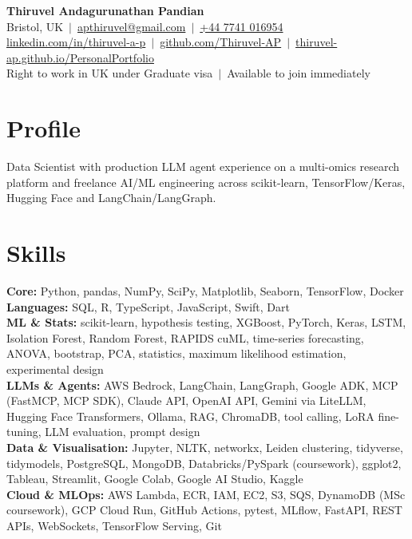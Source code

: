 \documentclass[a4paper,11pt]{article}
\begin{document}
\fontsize{11}{13.2}\selectfont

\begin{center}
  {\LARGE\bfseries Thiruvel Andagurunathan Pandian}\\[3pt]
  Bristol, UK \,$|$\, \href{mailto:apthiruvel@gmail.com}{apthiruvel@gmail.com} \,$|$\, \href{tel:+447741016954}{+44 7741 016954}\\[1pt]
\href{https://www.linkedin.com/in/thiruvel-a-p/}{linkedin.com/in/thiruvel-a-p} \,$|$\, \href{https://github.com/Thiruvel-AP}{github.com/Thiruvel-AP} \,$|$\, \href{https://thiruvel-ap.github.io/PersonalPortfolio/}{thiruvel-ap.github.io/PersonalPortfolio}\\[1pt]
  Right to work in UK under Graduate visa \,$|$\, Available to join immediately
\end{center}

\section{Profile}
Data Scientist with production LLM agent experience on a multi-omics research platform and freelance AI/ML engineering across scikit-learn, TensorFlow/Keras, Hugging Face and LangChain/LangGraph.

\section{Skills}
\textbf{Core:} Python, pandas, NumPy, SciPy, Matplotlib, Seaborn, TensorFlow, Docker\\[2pt]
\textbf{Languages:} SQL, R, TypeScript, JavaScript, Swift, Dart\\[2pt]
\textbf{ML \& Stats:} scikit-learn, hypothesis testing, XGBoost, PyTorch, Keras, LSTM, Isolation Forest, Random Forest, RAPIDS cuML, time-series forecasting, ANOVA, bootstrap, PCA, statistics, maximum likelihood estimation, experimental design\\[2pt]
\textbf{LLMs \& Agents:} AWS Bedrock, LangChain, LangGraph, Google ADK, MCP (FastMCP, MCP SDK), Claude API, OpenAI API, Gemini via LiteLLM, Hugging Face Transformers, Ollama, RAG, ChromaDB, tool calling, LoRA fine-tuning, LLM evaluation, prompt design\\[2pt]
\textbf{Data \& Visualisation:} Jupyter, NLTK, networkx, Leiden clustering, tidyverse, tidymodels, PostgreSQL, MongoDB, Databricks/PySpark (coursework), ggplot2, Tableau, Streamlit, Google Colab, Google AI Studio, Kaggle\\[2pt]
\textbf{Cloud \& MLOps:} AWS Lambda, ECR, IAM, EC2, S3, SQS, DynamoDB (MSc coursework), GCP Cloud Run, GitHub Actions, pytest, MLflow, FastAPI, REST APIs, WebSockets, TensorFlow Serving, Git
\end{document}
